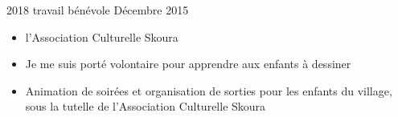 \begin{experiences}
	\experience
	{2018}   {travail bénévole}{}{}
	{Décembre 2015} {
		\begin{itemize}
			\item  l'Association Culturelle Skoura
			\item  Je me suis porté volontaire pour apprendre aux enfants à dessiner
			\item Animation de soirées et organisation de sorties pour les enfants du village, sous la tutelle de l'Association Culturelle Skoura
		\end{itemize}
	}
	{}

\end{experiences}
